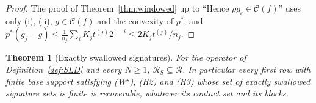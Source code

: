 \documentclass[10pt]{amsart}
\newtheorem{theorem}{Theorem}[section]
\theoremstyle{definition}
\theoremstyle{remark}
\newcommand{\Cset}{\mathcal C}
\newcommand{\Rec}{\mathcal R}
\begin{document}
\begin{proof}
The proof of Theorem~\ref{thm:windowed} up to ``Hence $\rho g_c\in
\Cset(f)$'' uses only (i), (ii), $g\in\Cset(f)$ and the convexity of
$p^*$; and $p^*(\bar g_j-g)\le\frac1{n_j}\sum_iK_jt^{(j)}2^{1-i}\le
2K_jt^{(j)}/n_j$.
\end{proof}

\begin{theorem}[Exactly swallowed signatures]\label{thm:S}
For the operator of Definition~\ref{def:SLD} and every $N\ge1$,
$\mathcal R_S\subseteq\Rec$.  In particular every first row with finite
base support satisfying \textup{(W$^\star$)}, \textup{(H2)} and
\textup{(H3)} whose set of exactly swallowed signature sets is finite is
recoverable, whatever its contact set and its blocks.
\end{theorem}
\end{document}
